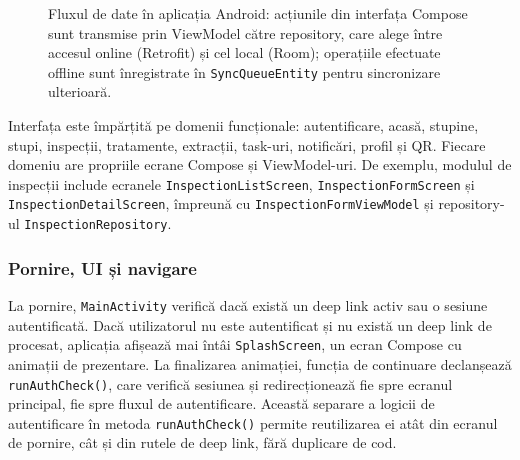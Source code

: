 \begin{figure}[H]
\centering
{}
\caption{Fluxul de date în aplicația Android: acțiunile din interfața Compose sunt transmise prin ViewModel către repository, care alege între accesul online (Retrofit) și cel local (Room); operațiile efectuate offline sunt înregistrate în \texttt{SyncQueueEntity} pentru sincronizare ulterioară.}
\label{fig:flux-date-android}
\end{figure}

Interfața este împărțită pe domenii funcționale: autentificare, acasă, stupine, stupi, inspecții, tratamente, extracții, task-uri, notificări, profil și QR. Fiecare domeniu are propriile ecrane Compose și ViewModel-uri. De exemplu, modulul de inspecții include ecranele \texttt{InspectionListScreen}, \texttt{InspectionFormScreen} și \texttt{InspectionDetailScreen}, împreună cu \texttt{InspectionFormViewModel} și repository-ul \texttt{InspectionRepository}.

\subsubsection*{Pornire, UI și navigare}

La pornire, \texttt{MainActivity} verifică dacă există un deep link activ sau o sesiune autentificată. Dacă utilizatorul nu este autentificat și nu există un deep link de procesat, aplicația afișează mai întâi \texttt{SplashScreen}, un ecran Compose cu animații de prezentare. La finalizarea animației, funcția de continuare declanșează \texttt{runAuthCheck()}, care verifică sesiunea și redirecționează fie spre ecranul principal, fie spre fluxul de autentificare. Această separare a logicii de autentificare în metoda \texttt{runAuthCheck()} permite reutilizarea ei atât din ecranul de pornire, cât și din rutele de deep link, fără duplicare de cod.

